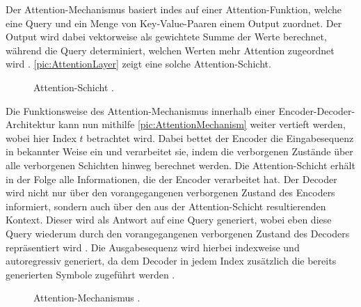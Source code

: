 \noindent
Der Attention-Mechanismus basiert indes auf einer Attention-Funktion, welche eine Query und ein Menge von Key-Value-Paaren einem Output zuordnet. Der Output wird dabei vektorweise als gewichtete Summe der Werte berechnet, während die Query determiniert, welchen Werten mehr Attention zugeordnet wird \cite{VAS17}. \autoref{pic:AttentionLayer} zeigt eine solche Attention-Schicht.\\

\begin{figure}[h!]
  \centering
  \caption{Attention-Schicht \cite[S.~390]{ZHA20}.}
  \label{pic:AttentionLayer}
\end{figure}

\noindent
Die Funktionsweise des Attention-Mechanismus innerhalb einer Encoder-Decoder-Architektur kann nun mithilfe \autoref{pic:AttentionMechanism} weiter vertieft werden, wobei hier Index $t$ betrachtet wird. Dabei bettet der Encoder die Eingabesequenz in bekannter Weise ein und verarbeitet sie, indem die verborgenen Zustände über alle verborgenen Schichten hinweg berechnet werden. Die Attention-Schicht erhält in der Folge alle Informationen, die der Encoder verarbeitet hat. Der Decoder wird nicht nur über den vorangegangenen verborgenen Zustand des Encoders informiert, sondern auch über den aus der Attention-Schicht resultierenden Kontext. Dieser wird als Antwort auf eine Query generiert, wobei eben diese Query wiederum durch den vorangegangenen verborgenen Zustand des Decoders repräsentiert wird \cite[S.~394]{ZHA20}. Die Ausgabesequenz wird hierbei indexweise und autoregressiv generiert, da dem Decoder in jedem Index zusätzlich die bereits generierten Symbole zugeführt werden \cite{VAS17}.

\begin{figure}[h!]
  \centering
  \caption{Attention-Mechanismus \cite[S.~394]{ZHA20}.}
  \label{pic:AttentionMechanism}
\end{figure}

